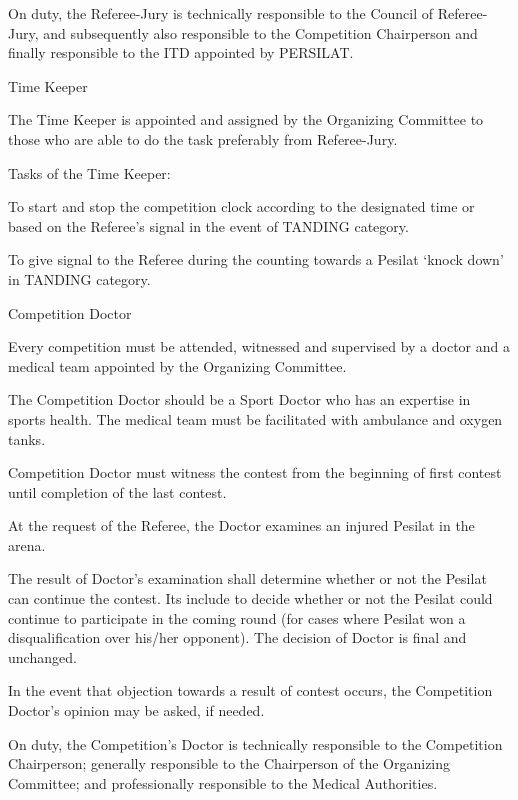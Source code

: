 \begin{legal}
\begin{legal}
    \item On duty, the Referee-Jury is technically responsible to the Council of Referee-Jury,
and subsequently also responsible to the Competition Chairperson and finally
responsible to the ITD appointed by PERSILAT.
    \end{legal}
\item Time Keeper
    \begin{legal}
    \item The Time Keeper is appointed and assigned by the Organizing Committee to those
who are able to do the task preferably from Referee-Jury.
    \item Tasks of the Time Keeper:
        \begin{legal}
        \item To start and stop the competition clock according to the designated time
or based on the Referee’s signal in the event of TANDING category.
        \item To give signal to the Referee during the counting towards a Pesilat ‘knock
down’ in TANDING category.
        \end{legal}
    \end{legal}

\item Competition Doctor

    \begin{legal}
    \item Every competition must be attended, witnessed and supervised by a doctor and a medical team appointed by the Organizing Committee.
    \item The Competition Doctor should be a Sport Doctor who has an expertise in sports health. The medical team must be facilitated with ambulance and oxygen tanks.
    \item Competition Doctor must witness the contest from the beginning of first contest until completion of the last contest.
    \item At the request of the Referee, the Doctor examines an injured Pesilat in the arena.
    \item The result of Doctor’s examination shall determine whether or not the Pesilat can continue the contest. Its include to decide whether or not the Pesilat could continue to participate in the coming round (for cases where Pesilat won a disqualification over his/her opponent). The decision of Doctor is final and unchanged.
    \item In the event that objection towards a result of contest occurs, the Competition Doctor’s opinion may be asked, if needed.
    \item On duty, the Competition’s Doctor is technically responsible to the Competition Chairperson; generally responsible to the Chairperson of the Organizing Committee; and professionally responsible to the Medical Authorities.
    \end{legal}

\end{legal}


